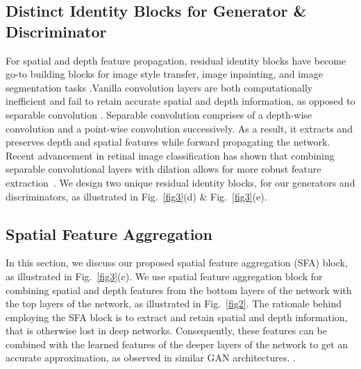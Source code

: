 \documentclass[runningheads]{llncs}
\begin{document}
\subsection{Distinct Identity Blocks for Generator \& Discriminator}
\label{subsec:residualblock}
For spatial and depth feature propagation, residual identity blocks have become go-to building blocks for image style transfer, image inpainting, and image segmentation tasks \cite{shaham2019singan,wang2018high,choi2020stargan,choi2018stargan,park2019semantic}.\iffalse The original design consisted of a residual block with two consecutive convolution layers and a skip connection that adds feature tensor of the input with the output. \fi Vanilla convolution layers are both computationally inefficient and fail to retain accurate spatial and depth information, as opposed to separable convolution \cite{chollet2017xception}. Separable convolution comprises of a depth-wise convolution and a point-wise convolution successively. As a result, it extracts and preserves depth and spatial features while forward propagating the network. Recent advancement in retinal image classification has shown that combining separable convolutional layers with dilation allows for more robust feature extraction~\cite{opticnet19}. We design two unique residual identity blocks, for our generators and discriminators, as illustrated in Fig.~\ref{fig3}(d) \& Fig.~\ref{fig3}(e).
\subsection{Spatial Feature Aggregation}
\label{subsec:sfa}
In this section, we discuss our proposed spatial feature aggregation (SFA) block, as illustrated in Fig.~\ref{fig3}(c). We use spatial feature aggregation block for combining spatial and depth features from the bottom layers of the network with the top layers of the network, as illustrated in Fig.~\ref{fig2}.   The rationale behind employing the SFA block is to extract and retain spatial and depth information, that is otherwise lost in deep networks. Consequently, these features can be combined with the learned features of the deeper layers of the network to get an accurate approximation, as observed in similar GAN architectures. \cite{zhang2019self,chen2018attention}. 
\end{document}
